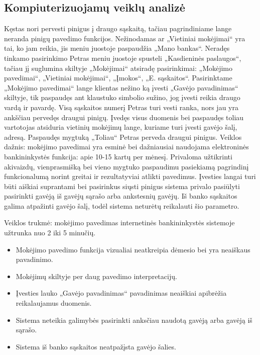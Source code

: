 \documentclass{VUMIFPSkursinis}
\begin{document}
\subsection{Kompiuterizuojamų veiklų analizė}
Kęstas nori pervesti pinigus į draugo sąskaitą, tačiau pagrindiniame lange neranda pinigų pavedimo funkcijos. Nežinodamas ar „Vietiniai mokėjimai“ yra tai, ko jam reikia, jis meniu juostoje paspaudžia „Mano bankas“. Neradęs tinkamo pasirinkimo Petras meniu juostoje spusteli „Kasdieninės paslaugos“, tačiau jį suglumina skiltyje „Mokėjimai“ atsiradę pasirinkimai: „Mokėjimo pavedimai“, „Vietiniai mokėjimai“, „Įmokos“, „E. sąskaitos“. Pasirinktame „Mokėjimo pavedimai“ lange klientas nežino ką įvesti „Gavėjo pavadinimas“ skiltyje, tik paspaudęs ant klaustuko simbolio sužino, jog įvesti reikia draugo vardą ir pavardę. Visą sąskaitos numerį Petras turi vesti ranka, nors jau yra ankščiau pervedęs draugui pinigų. Įvedęs visus duomenis bei paspaudęs toliau vartotojas atsiduria vietinių mokėjimų lange, kuriame turi įvesti gavėjo šalį, adresą. Paspaudęs mygtuką „Toliau“ Petras perveda draugui pinigus.
Veiklos dažnis: mokėjimo pavedimai yra esminė bei dažniausiai naudojama elektroninės bankininkystės funkcija: apie 10-15 kartų per mėnesį. Privaloma užtikrinti akivaizdų, vienprasmišką bei vieno mygtuko paspaudimu pasiekiamą pagrindinį funkcionalumą norint greitai ir rezultatyviai atlikti pavedimus. Įvesties langai turi būti aiškiai suprantami bei pasirinkus siųsti pinigus sistema privalo pasiūlyti pasirinkti gavėją iš gavėjų sąrašo arba ankstesnių gavėjų. Iš banko sąskaitos galima atpažinti gavėjo šalį, todėl sistema neturėtų reikalauti šio parametro. \par 
Veiklos trukmė: mokėjimo pavedimas internetinės bankininkystės sistemoje užtrunka nuo 2 iki 5 minučių.
\begin{itemize}
	\item Mokėjimo pavedimo funkcija vizualiai neatkreipia dėmesio bei yra neaiškaus pavadinimo.
	\item Mokėjimų skiltyje per daug pavedimo interpretacijų.
	\item Įvesties lauko „Gavėjo pavadinimas“ pavadinimas neaiškiai apibrėžia reikalaujamus duomenis.
	\item Sistema neteikia galimybės pasirinkti anksčiau naudotą gavėją arba gavėją iš sąrašo.
	\item Sistema iš banko sąskaitos neatpažįsta gavėjo šalies.
\end{itemize}
\end{document}
